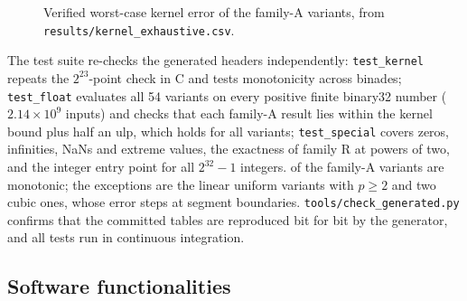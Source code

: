 \documentclass[preprint,12pt]{elsarticle}
\begin{document}
\begin{figure}[t]
\centering
{}
\caption{Verified worst-case kernel error of the family-A variants, from \texttt{results/kernel\_exhaustive.csv}.}
\label{fig:err}
\end{figure}

The test suite re-checks the generated headers independently:
\texttt{test\_kernel} repeats the $2^{23}$-point check in C and tests
monotonicity across binades; \texttt{test\_float} evaluates all 54 variants
on every positive finite binary32 number ($2.14\times10^{9}$ inputs) and
checks that each family-A result lies within the kernel bound plus half an
ulp, which holds for all \numnvariants{} variants; \texttt{test\_special}
covers zeros, infinities, NaNs and extreme values, the exactness of family R
at powers of two, and the integer entry point for all $2^{32}-1$ integers.
\numnmono{} of the \numnvariants{} family-A variants are monotonic; the
exceptions are the linear uniform variants with $p\ge2$ and two cubic ones, whose error
steps at segment boundaries. \texttt{tools/check\_generated.py} confirms that
the committed tables are reproduced bit for bit by the generator, and all
tests run in continuous integration.

\subsection{Software functionalities}
\end{document}
